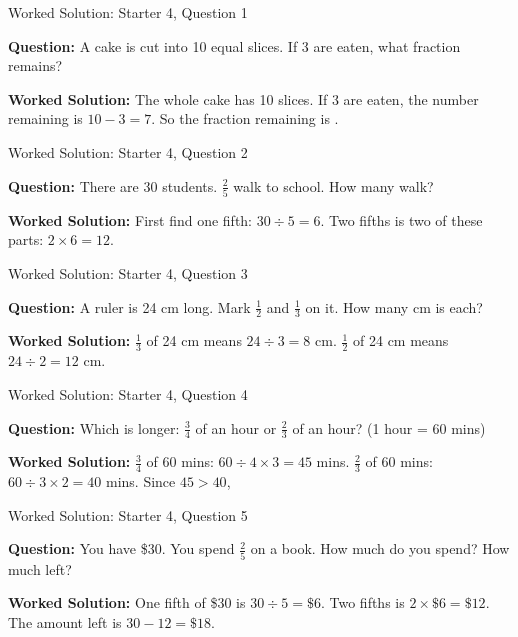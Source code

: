 \documentclass{beamer}
\newcommand{\ablank}[1]{%
  \alt<2>{\textcolor{red}{#1}}{\underline{\phantom{#1}}}%
}
\newcommand{\ashow}[1]{\uncover<2->{\textcolor{red}{\small #1}}}
\begin{document}
\begin{frame}{Worked Solution: Starter 4, Question 1}
\hypertarget{work-st4}{}

\textbf{Question:} A cake is cut into 10 equal slices. If 3 are eaten, what fraction remains?

\textbf{Worked Solution:} The whole cake has 10 slices. If 3 are eaten, the number remaining is $10-3=7$. So the fraction remaining is \ablank{$\frac{7}{10}$}.
\end{frame}

\begin{frame}{Worked Solution: Starter 4, Question 2}

\textbf{Question:} There are 30 students. $\frac{2}{5}$ walk to school. How many walk?

\textbf{Worked Solution:} First find one fifth: $30 \div 5 = 6$. Two fifths is two of these parts: $2 \times 6 = 12$. \ashow{12 students walk.}
\end{frame}

\begin{frame}{Worked Solution: Starter 4, Question 3}

\textbf{Question:} A ruler is 24 cm long. Mark $\frac{1}{2}$ and $\frac{1}{3}$ on it. How many cm is each?

\textbf{Worked Solution:} $\frac13$ of 24 cm means $24 \div 3 = 8$ cm. $\frac12$ of 24 cm means $24 \div 2 = 12$ cm. \ashow{$\frac13 = 8$ cm and $\frac12 = 12$ cm.}
\end{frame}

\begin{frame}{Worked Solution: Starter 4, Question 4}

\textbf{Question:} Which is longer: $\frac{3}{4}$ of an hour or $\frac{2}{3}$ of an hour? (1 hour = 60 mins)

\textbf{Worked Solution:} $\frac34$ of 60 mins: $60 \div 4 \times 3 = 45$ mins. $\frac23$ of 60 mins: $60 \div 3 \times 2 = 40$ mins. Since $45 > 40$, \ashow{$\frac34$ hour is longer.}
\end{frame}

\begin{frame}{Worked Solution: Starter 4, Question 5}

\textbf{Question:} You have \$30. You spend $\frac{2}{5}$ on a book. How much do you spend? How much left?

\textbf{Worked Solution:} One fifth of \$30 is $30 \div 5 = \$6$. Two fifths is $2 \times \$6 = \$12$. The amount left is $30 - 12 = \$18$. \ashow{Spend \$12, left \$18.}
\end{frame}
\end{document}
